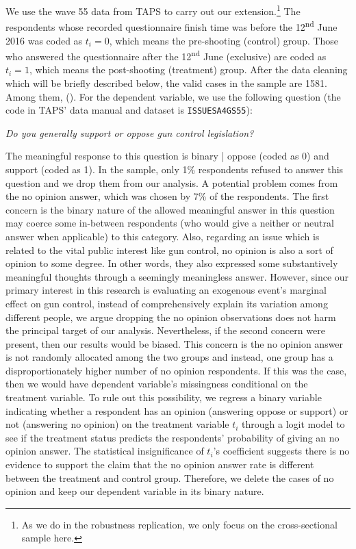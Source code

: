 \documentclass[11pt]{article}
\begin{document}
We use the wave 55 data from TAPS to carry out our extension.\footnote{As we do in the robustness replication, we only focus on the cross-sectional sample here.} The respondents whose recorded questionnaire finish time was before the 12\textsuperscript{nd} June 2016 was coded as \(t_i = 0\), which means the pre-shooting (control) group. Those who answered the questionnaire after the 12\textsuperscript{nd} June (exclusive) are coded as \(t_i = 1\), which means the post-shooting (treatment) group. After the data cleaning which will be briefly described below, the valid cases in the sample are 1581. Among them, (). For the dependent variable, we use the following question (the code in TAPS’ data manual and dataset is \texttt{ISSUESA4GS55}): 
\begin{displayquote}
\itshape
Do you generally support or oppose gun control legislation?
\end{displayquote}
The meaningful response to this question is binary | oppose (coded as 0) and support (coded as 1). In the sample, only 1\% respondents refused to answer this question and we drop them from our analysis. A potential problem comes from the no opinion answer, which was chosen by 7\% of the respondents. The first concern is the binary nature of the allowed meaningful answer in this question may coerce some in-between respondents (who would give a neither or neutral answer when applicable) to this category. Also, regarding an issue which is related to the vital public interest like gun control, no opinion is also a sort of opinion to some degree. In other words, they also expressed some substantively meaningful thoughts through a seemingly meaningless answer. However, since our primary interest in this research is evaluating an exogenous event’s marginal effect on gun control, instead of comprehensively explain its variation among different people, we argue dropping the no opinion observations does not harm the principal target of our analysis. Nevertheless, if the second concern were present, then our results would be biased. This concern is the no opinion answer is not randomly allocated among the two groups and instead, one group has a disproportionately higher number of no opinion respondents. If this was the case, then we would have dependent variable’s missingness conditional on the treatment variable. To rule out this possibility, we regress a binary variable indicating whether a respondent has an opinion (answering oppose or support) or not (answering no opinion) on the treatment variable \(t_i\) through a logit model to see if the treatment status predicts the respondents’ probability of giving an no opinion answer. The statistical insignificance of \(t_i\)’s coefficient suggests there is no evidence to support the claim that the no opinion answer rate is different between the treatment and control group. Therefore, we delete the cases of no opinion and keep our dependent variable in its binary nature. 
\end{document}
